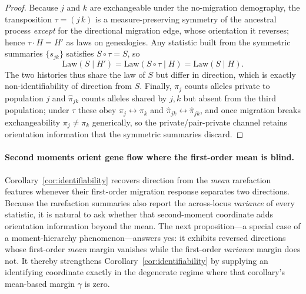 \documentclass[11pt]{article}
\theoremstyle{plain}
\theoremstyle{definition}
\theoremstyle{remark}
\begin{document}
\begin{proof}
Because $j$ and $k$ are exchangeable under the no-migration demography, the transposition
$\tau=(j\,k)$ is a measure-preserving symmetry of the ancestral process \emph{except} for the
directional migration edge, whose orientation it reverses; hence $\tau\!\cdot\! H=H'$ as laws
on genealogies. Any statistic built from the symmetric summaries $\{s_{jk}\}$ satisfies
$S\circ\tau=S$, so
\[
\mathrm{Law}(S\mid H')=\mathrm{Law}(S\circ\tau\mid H)=\mathrm{Law}(S\mid H).
\]
The two histories thus share the law of $S$ but differ in direction, which is exactly
non-identifiability of direction from $S$. Finally, $\pi_j$ counts alleles private to
population $j$ and $\widehat\pi_{jk}$ counts alleles shared by $j,k$ but absent from the third
population; under $\tau$ these obey $\pi_j\leftrightarrow\pi_k$ and
$\widehat\pi_{jk}\leftrightarrow\widehat\pi_{jk}$, and once migration breaks exchangeability
$\pi_j\neq\pi_k$ generically, so the private/pair-private channel retains orientation
information that the symmetric summaries discard.
\end{proof}

\paragraph{Second moments orient gene flow where the first-order mean is blind.}
Corollary~\ref{cor:identifiability} recovers direction from the \emph{mean} rarefaction features
whenever their first-order migration response separates two directions. Because the rarefaction summaries also
report the across-locus \emph{variance} of every statistic, it is natural to ask whether that
second-moment coordinate adds orientation information beyond the mean. The next proposition---a
special case of a moment-hierarchy phenomenon---answers yes: it exhibits reversed directions
whose first-order \emph{mean} margin vanishes while the first-order \emph{variance} margin does
not. It thereby strengthens Corollary~\ref{cor:identifiability} by supplying an identifying
coordinate exactly in the degenerate regime where that corollary's mean-based margin $\gamma$ is
zero.
\end{document}
